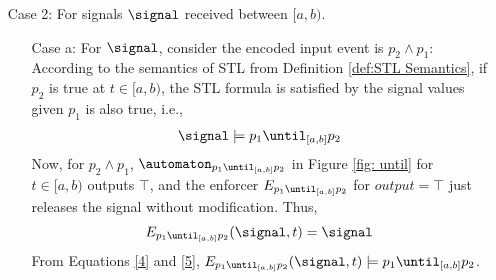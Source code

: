 \begin{enumerate}
\begin{enumerate}
            According to the semantics of STL from Definition \ref{def:STL Semantics} $p_1$ should be continuously true at all times $t \in [0, a)$. This case considers $\neg p_1$ being received at $t \in [0, a)$. So, the STL formula is not satisfied by the signal values. \\%
            
            $\automaton_{p_1\until_{[a,b]}p_2}$ considering $p_1$ and  $t \in [0, a)$, outputs $\bot_1$, and the enforcer $E_{p_1\until_{[a,b]}p_2}$ reconstructs and outputs the signal $\signal'$, i.e.,
            \begin{equation}    
            \begin{split}
            \label{3}
                \signal \not \models p_1\until_{[a,b]}p_2 \implies \exists\signal', E_{p_1\until_{[a,b]}p_2}(\signal, t)=\signal' : \\(min(|\signal'-\signal|) \land p_1(\signal')=\top \land (\signal'\models p_1\until_{[a,b]}p_2))
            \end{split}
            \end{equation}    

            From Equations \ref{3},  $E_{p_1\until_{[a,b]}p_2}(\signal, t) \models p_1\until_{[a,b]}p_2$. \\~\\
        \end{enumerate}
        
        \item [Case 2:] For signals $\signal$ received between $[a,b)$.\\
            \begin{enumerate}
                \item [Case a:] For $\signal$, consider the encoded input event is $p_2 \land p_1$:\\
                
                According to the semantics of STL from Definition \ref{def:STL Semantics}, if  $p_2$ is true at  $t \in [a, b)$, the STL formula is satisfied by the signal values given $p_1$ is also true, i.e., 
                \begin{align}
                    \label{4}
                        \signal \models p_1\until_{[a,b]}p_2
                \end{align}
                Now, for $p_2 \land p_1$, $\automaton_{p_1\until_{[a,b]}p_2}$ in Figure \ref{fig: until} for $t \in [a, b)$ outputs $\top$, and the enforcer $E_{p_1\until_{[a,b]}p_2}$ for $output=\top$ just releases the signal without modification. Thus,
                \begin{align}
                \label{5}
                    E_{p_1\until_{[a,b]}p_2}(\signal, t)=\signal
                \end{align}
                From Equations \ref{4} and \ref{5},  $E_{p_1\until_{[a,b]}p_2}(\signal, t) \models p_1\until_{[a,b]}p_2$. \\~\\
                

\end{enumerate}
\end{enumerate}

